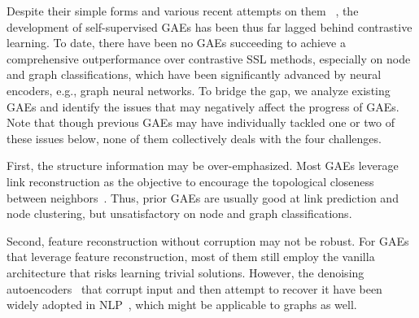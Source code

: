 Despite their simple forms and various recent attempts 
on them ~\cite{you2020does,jin2020self,hu2020strategies,park2019symmetric,amin2020gate,cui2020adaptive}, the development of self-supervised GAEs has been 
thus far lagged behind contrastive learning. 
To date, there have been no GAEs succeeding to achieve a comprehensive outperformance over contrastive SSL methods, especially on node and graph classifications, which have been significantly advanced by neural encoders, 
e.g., graph neural networks. 
To bridge the gap, we  analyze %
existing GAEs and identify the  issues that may negatively affect the progress of GAEs. 
Note that though previous GAEs may have individually tackled one or two of these issues below, 
none of them collectively deals with the four challenges. 


First, the structure information may be over-emphasized. 
Most  GAEs leverage  link reconstruction as the objective to encourage the topological closeness between neighbors~\cite{kipf2016variational,pan2018adversarially,wang2017mgae,amin2020gate,hu2020gpt,cui2020adaptive}. 
Thus, prior GAEs are usually good at link prediction and node clustering, but unsatisfactory on node and graph classifications. 

Second, feature reconstruction without corruption may not be robust. 
For GAEs~\cite{kipf2016variational,pan2018adversarially,park2019symmetric,amin2020gate,cui2020adaptive} that leverage feature reconstruction, most of them still employ the vanilla architecture that risks learning trivial solutions. 
However, the denoising autoencoders~\cite{vincent2008extracting} that corrupt input and then attempt to recover it have been widely adopted in NLP~\cite{devlin2019bert}, which might be applicable to graphs as well.

